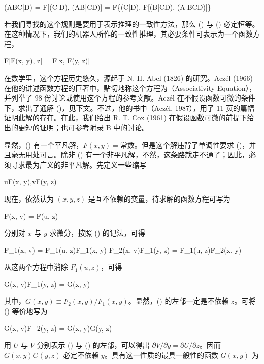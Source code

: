 \placeformula[subeq:2]
\startformula
(ABC|D) = F[(C|D), (AB|CD)] = F\{(C|D), F[(B|CD), (A|BCD)]\}
\stopformula
\stopsubformulas

若我们寻找的这个规则是要用于表示推理的一致性方法，那么 (\in[subeq:1]) 与 (\in[subeq:2]) 必定恒等。在这种情况下，我们的机器人所作的一致性推理，其必要条件可表示为一个函数方程，

\placeformula[function-eq]
\startformula
F[F(x, y), z] = F[x, F(y, z)]
\stopformula

在数学里，这个方程历史悠久，源起于 N. H. Abel (1826) 的研究。Acz\'el (1966) 在他的讲述函数方程的巨著中，贴切地称这个方程为（Associativity Equation），并列举了 98 份讨论或使用这个方程的参考文献。Acz\'el 在不假设函数可微的条件下，求出了通解 ()，见下文。不过，他的书中（Acz\'el, 1987），用了 11 页的篇幅证明此解的存在。在此，我们给出 R. T. Cox (1961) 在假设函数可微的前提下给出的更短的证明；也可参考附录 B 中的讨论。

显然，(\in[function-eq]) 有一个平凡解，$F(x, y) = \text{常数}$。但是这个解违背了单调性要求 ()，并且毫无用处可言。除非 (\in[function-eq]) 有一个非平凡解，不然，这条路就走不通了；因此，必须寻求最为广义的非平凡解。先定义一些缩写

\placeformula
\startformula
u\equiv F(x, y),\quad v\equiv F(y, z)
\stopformula

现在，依然认为 $(x, y, z)$ 是互不依赖的变量，待求解的函数方程可写为

\placeformula[eq-target]
\startformula
F(x, v) = F(u, z)
\stopformula

分别对 $x$ 与 $y$ 求微分，按照 () 的记法，可得

\placeformula[elim]
\startformula
\startmathalignment
\NC F_1(x, v) \NC = F_1(u, z)F_1(x, y)\NR
\NC F_2(x, v)F_1(y, z) \NC = F_1(u, z)F_2(x, y)\NR
\stopmathalignment
\stopformula

从这两个方程中消除 $F_1(u, z)$，可得

\placeformula[eq-U]
\startformula
G(x, v)F_1(y, z) = G(x, y)
\stopformula

其中，$G(x, y)\equiv F_2(x, y)/F_1(x, y)$。显然，(\in[elim]) 的左部一定是不依赖 $z$。可将 (\in[eq-U]) 等价地写为

\placeformula[eq-V]
\startformula
G(x, v)F_2(y, z) = G(x, y)G(y, z)
\stopformula

用 $U$ 与 $V$ 分别表示 (\in[eq-U]) 与 (\in[eq-V]) 的左部，可以得出 $\partial V/\partial y = \partial U/\partial z$。因而 $G(x, y)G(y, z)$ 必定不依赖 $y$。具有这一性质的最具一般性的函数 $G(x, y)$ 为

